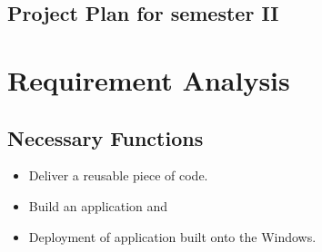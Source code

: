 \documentclass[openany,12pt]{report}
\begin{document}
\subsection{Project Plan for semester II}

\section{Requirement Analysis}

\subsection{Necessary Functions}
\begin{itemize}
\item{Deliver a reusable piece of code.}
\item{Build an application and}
\item{Deployment of application built onto the Windows.}
\end{itemize}
\end{document}

